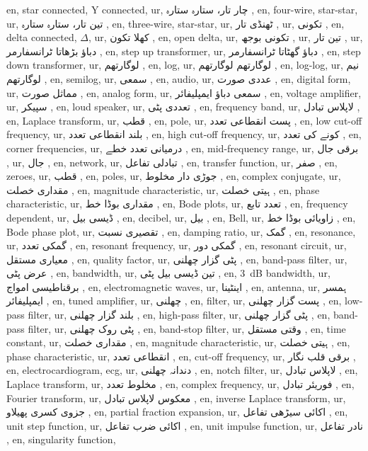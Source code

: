en, star connected, Y connected,
ur, چار تار، ستارہ ستارہ ,
en, four-wire, star-star,
ur, تین تار، ستارہ ستارہ ,
en, three-wire, star-star,
ur, ٹھنڈی تار ,
ur, تکونی ,
en, delta connected, $\Delta $,
ur, کھلا تکون ,
en, open delta,
ur, تکونی بوجھ ,
ur, تین تار ,
ur, دباؤ بڑھاتا ٹرانسفارمر ,
en, step up transformer,
ur, دباؤ گھٹاتا ٹرانسفارمر ,
en, step down transformer,
ur, لوگارتھم ,
en, log,
ur, لوگارتھم لوگارتھم ,
en, log-log,
ur, نیم لوگارتھم ,
en, semilog,
ur, سمعی ,
en, audio,
ur, عددی صورت ,
en, digital form,
ur, مماثل صورت ,
en, analog form,
ur, سمعی دباؤ ایمپلیفائر ,
en, voltage amplifier,
ur, سپیکر ,
en, loud speaker,
ur, تعددی پٹی ,
en, frequency band,
ur, لاپلاس تبادل ,
en, Laplace transform,
ur, قطب ,
en, pole,
ur, پست انقطاعی تعدد ,
en, low cut-off frequency,
ur, بلند انقطاعی تعدد ,
en, high cut-off frequency,
ur, کونے کی تعدد ,
en, corner frequencies,
ur, درمیانی تعدد خطے ,
en, mid-frequency range,
ur, برقی جال ,
ur, جال ,
en, network,
ur, تبادلی تفاعل ,
en, transfer function,
ur, صفر ,
en, zeroes,
ur, قطب ,
en, poles,
ur, جوڑی دار مخلوط ,
en, complex conjugate,
ur, مقداری خصلت ,
en, magnitude characteristic,
ur, ہیتی خصلت ,
en, phase characteristic,
ur, مقداری بوڈا خط ,
en, Bode plots,
ur, تعدد تابع ,
en, frequency dependent,
ur, ڈیسی بیل ,
en, decibel,
ur, بیل ,
en, Bell,
ur, زاویائی بوڈا خط ,
en, Bode phase plot,
ur, تقصیری نسبت ,
en, damping ratio,
ur, گمک ,
en, resonance,
ur, گمکی تعدد ,
en, resonant frequency,
ur, گمکی دور ,
en, resonant circuit,
ur, معیاری مستقل ,
en, quality factor,
ur, پٹی گزار چھلنی ,
en, band-pass filter,
ur, عرض پٹی ,
en, bandwidth,
ur, تین ڈیسی بیل پٹی ,
en, \SI {3}{\deci \bel } bandwidth,
ur, برقناطیسی امواج ,
en, electromagnetic waves,
ur, اینٹینا ,
en, antenna,
ur, ہمسر ایمپلیفائر ,
en, tuned amplifier,
ur, چھلنی ,
en, filter,
ur, پست گزار چھلنی ,
en, low-pass filter,
ur, بلند گزار چھلنی ,
en, high-pass filter,
ur, پٹی گزار چھلنی ,
en, band-pass filter,
ur, پٹی روک چھلنی ,
en, band-stop filter,
ur, وقتی مستقل ,
en, time constant,
ur, مقداری خصلت ,
en, magnitude characteristic,
ur, ہیتی خصلت ,
en, phase characteristic,
ur, انقطاعی تعدد ,
en, cut-off frequency,
ur, برقی قلب نگار ,
en, electrocardiogram, ecg,
ur, دندانہ چھلنی ,
en, notch filter,
ur, لاپلاس تبادل ,
en, Laplace transform,
ur, مخلوط تعدد ,
en, complex frequency,
ur, فوریئر تبادل ,
en, Fourier transform,
ur, معکوس لاپلاس تبادل ,
en, inverse Laplace transform,
ur, جزوی کسری پھیلاو ,
en, partial fraction expansion,
ur, اکائی سیڑھی تفاعل ,
en, unit step function,
ur, اکائی ضرب تفاعل ,
en, unit impulse function,
ur, نادر تفاعل ,
en, singularity function,

